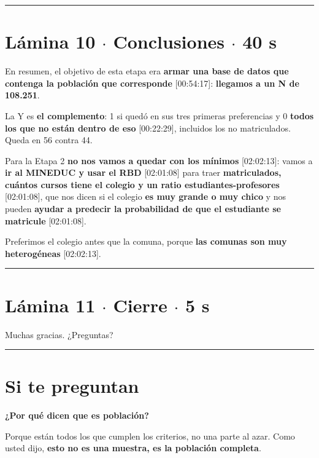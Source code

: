 \documentclass[11pt]{article}
\begin{document}
\medskip\hrule\medskip

\section*{Lámina 10 $\cdot$ Conclusiones $\cdot$ 40 s}

\begin{guion}En resumen, el objetivo de esta etapa era \textbf{armar una base de datos que contenga la población que corresponde} [00:54:17]: \textbf{llegamos a un N de 108.251}.\par La Y es \textbf{el complemento}: 1 si quedó en sus tres primeras preferencias y 0 \textbf{todos los que no están dentro de eso} [00:22:29], incluidos los no matriculados. Queda en 56 contra 44.\par Para la Etapa 2 \textbf{no nos vamos a quedar con los mínimos} [02:02:13]: vamos a \textbf{ir al MINEDUC y usar el RBD} [02:01:08] para traer \textbf{matriculados, cuántos cursos tiene el colegio y un ratio estudiantes-profesores} [02:01:08], que nos dicen si el colegio \textbf{es muy grande o muy chico} y nos pueden \textbf{ayudar a predecir la probabilidad de que el estudiante se matricule} [02:01:08].\par Preferimos el colegio antes que la comuna, porque \textbf{las comunas son muy heterogéneas} [02:02:13].\end{guion}

\medskip\hrule\medskip

\section*{Lámina 11 $\cdot$ Cierre $\cdot$ 5 s}

\begin{guion}Muchas gracias. ¿Preguntas?\end{guion}

\medskip\hrule\medskip

\section*{Si te preguntan}

\textbf{¿Por qué dicen que es población?}\par
\begin{guion}Porque están todos los que cumplen los criterios, no una parte al azar. Como usted dijo, \textbf{esto no es una muestra, es la población completa}.\end{guion}
\end{document}
